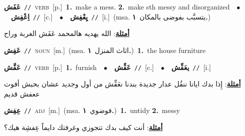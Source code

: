 \documentclass[10pt,a4paper,twoside]{article} %
\begin{document}
\begin{multicols}{2}
{\setlength\topsep{0pt}\textbf{\foreignlanguage{arabic}{عَفَش}}\ {\color{gray}\texttt{//}\color{black}}\ \textsc{verb}\ [p.]\ \textbf{1.}~make a mess.  \textbf{2.}~make sth messy and disorganized\ \ $\bullet$\ \ \setlength\topsep{0pt}\textbf{\foreignlanguage{arabic}{اِعْفِش}}\ {\color{gray}\texttt{//}\color{black}}\ [c.]\ \ $\bullet$\ \ \setlength\topsep{0pt}\textbf{\foreignlanguage{arabic}{يِعْفِش}}\ {\color{gray}\texttt{//}\color{black}}\ [i.]\ \color{gray}(msa. \foreignlanguage{arabic}{يتسبَّب بفوضى بالمكان}~\foreignlanguage{arabic}{\textbf{١.}})\color{black}\  \begin{flushright}\color{gray}\foreignlanguage{arabic}{\textbf{\underline{\foreignlanguage{arabic}{أمثلة}}}: الله يهديه هالمحمد عَفَش الغربة وراح}\end{flushright}\color{black}} \vspace{2mm}

{\setlength\topsep{0pt}\textbf{\foreignlanguage{arabic}{عَفِش}}\ {\color{gray}\texttt{//}\color{black}}\ \textsc{noun}\ [m.]\ \color{gray}(msa. \foreignlanguage{arabic}{اثاث المنزل}~\foreignlanguage{arabic}{\textbf{١.}})\color{black}\ \textbf{1.}~the house furniture\ } \vspace{2mm}

{\setlength\topsep{0pt}\textbf{\foreignlanguage{arabic}{عَفَّش}}\ {\color{gray}\texttt{//}\color{black}}\ \textsc{verb}\ [p.]\ \textbf{1.}~furnish\ \ $\bullet$\ \ \setlength\topsep{0pt}\textbf{\foreignlanguage{arabic}{عَفِّش}}\ {\color{gray}\texttt{//}\color{black}}\ [c.]\ \ $\bullet$\ \ \setlength\topsep{0pt}\textbf{\foreignlanguage{arabic}{يعَفِّش}}\ {\color{gray}\texttt{//}\color{black}}\ [i.]\  \begin{flushright}\color{gray}\foreignlanguage{arabic}{\textbf{\underline{\foreignlanguage{arabic}{أمثلة}}}: إِذا بدك ايانا ننقُل عدار جديدة بندنا نعَفِّش من أول وجديد عشان بحبش أفوت ععفش قديم}\end{flushright}\color{black}} \vspace{2mm}

{\setlength\topsep{0pt}\textbf{\foreignlanguage{arabic}{عِفِش}}\ {\color{gray}\texttt{//}\color{black}}\ \textsc{adj}\ [m.]\ \color{gray}(msa. \foreignlanguage{arabic}{فوضوي}~\foreignlanguage{arabic}{\textbf{١.}})\color{black}\ \textbf{1.}~untidy  \textbf{2.}~messy\  \begin{flushright}\color{gray}\foreignlanguage{arabic}{\textbf{\underline{\foreignlanguage{arabic}{أمثلة}}}: أنت كيف بدك تتجوزي وغرفتك دايماً عِفشِة هيك؟}\end{flushright}\color{black}} \vspace{2mm}


\end{multicols}
\end{document}
